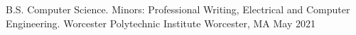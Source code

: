 

\begin{cventries}

  \cventry
    {B.S. Computer Science. Minors: Professional Writing, Electrical and Computer Engineering.} %
    {Worcester Polytechnic Institute} %
    {Worcester, MA} %
    {May 2021} %
    {
    }
\end{cventries}
